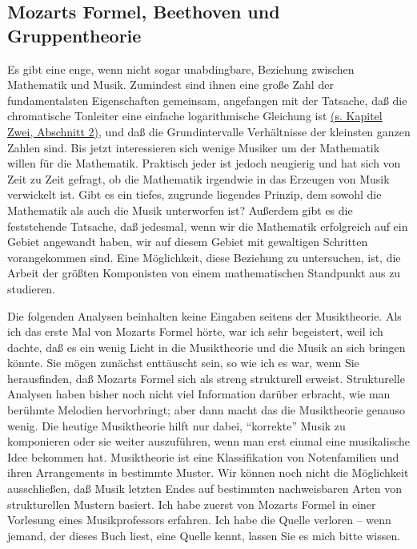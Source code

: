 
\subsection{Mozarts Formel, Beethoven und Gruppentheorie}
\label{c1iv4}

Es gibt eine enge, wenn nicht sogar unabdingbare, Beziehung zwischen Mathematik und Musik.
Zumindest sind ihnen eine große Zahl der fundamentalsten Eigenschaften gemeinsam, angefangen mit der Tatsache, daß die chromatische Tonleiter eine einfache logarithmische Gleichung ist \hyperref[c2_2]{(s. Kapitel Zwei, Abschnitt 2)}, und daß die Grundintervalle Verhältnisse der kleinsten ganzen Zahlen sind.
Bis jetzt interessieren sich wenige Musiker um der Mathematik willen für die Mathematik.
Praktisch jeder ist jedoch neugierig und hat sich von Zeit zu Zeit gefragt, ob die Mathematik irgendwie in das Erzeugen von Musik verwickelt ist.
Gibt es ein tiefes, zugrunde liegendes Prinzip, dem sowohl die Mathematik als auch die Musik unterworfen ist?
Außerdem gibt es die feststehende Tatsache, daß jedesmal, wenn wir die Mathematik erfolgreich auf ein Gebiet angewandt haben, wir auf diesem Gebiet mit gewaltigen Schritten vorangekommen sind.
Eine Möglichkeit, diese Beziehung zu untersuchen, ist, die Arbeit der größten Komponisten von einem mathematischen Standpunkt aus zu studieren.

Die folgenden Analysen beinhalten keine Eingaben seitens der Musiktheorie.
Als ich das erste Mal von Mozarts Formel hörte, war ich sehr begeistert, weil ich dachte, daß es ein wenig Licht in die Musiktheorie und die Musik an sich bringen könnte.
Sie mögen zunächst enttäuscht sein, so wie ich es war, wenn Sie herausfinden, daß Mozarts Formel sich als streng strukturell erweist.
Strukturelle Analysen haben bisher noch nicht viel Information darüber erbracht, wie man berühmte Melodien hervorbringt; aber dann macht das die Musiktheorie genauso wenig.
Die heutige Musiktheorie hilft nur dabei, \enquote{korrekte} Musik zu komponieren oder sie weiter auszuführen, wenn man erst einmal eine musikalische Idee bekommen hat.
Musiktheorie ist eine Klassifikation von Notenfamilien und ihren Arrangements in bestimmte Muster.
Wir können noch nicht die Möglichkeit ausschließen, daß Musik letzten Endes auf bestimmten nachweisbaren Arten von strukturellen Mustern basiert.
Ich habe zuerst von Mozarts Formel in einer Vorlesung eines Musikprofessors erfahren.
Ich habe die Quelle verloren -- wenn jemand, der dieses Buch liest, eine Quelle kennt, lassen Sie es mich bitte wissen.

